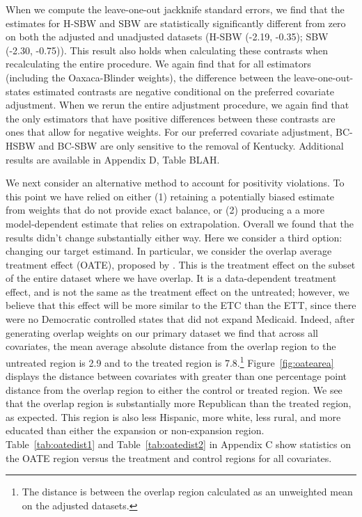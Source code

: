 \documentclass[12pt]{article}
\begin{document}
When we compute the leave-one-out jackknife standard errors, we find that the estimates for H-SBW and SBW are statistically significantly different from zero on both the adjusted and unadjusted datasets (H-SBW (-2.19, -0.35); SBW (-2.30, -0.75)). This result also holds when calculating these contrasts when recalculating the entire procedure. We again find that for all estimators (including the Oaxaca-Blinder weights), the difference between the leave-one-out-states estimated contrasts are negative conditional on the preferred covariate adjustment. When we rerun the entire adjustment procedure, we again find that the only estimators that have positive differences between these contrasts are ones that allow for negative weights. For our preferred covariate adjustment, BC-HSBW and BC-SBW are only sensitive to the removal of Kentucky. Additional results are available in Appendix D, Table BLAH. 

We next consider an alternative method to account for positivity violations. To this point we have relied on either (1) retaining a potentially biased estimate from weights that do not provide exact balance, or (2) producing a a more model-dependent estimate that relies on extrapolation. Overall we found that the results didn't change substantially either way. Here we consider a third option: changing our target estimand. In particular, we consider the overlap average treatment effect (OATE), proposed by \cite{li2018balancing}. This is the treatment effect on the subset of the entire dataset where we have overlap. It is a data-dependent treatment effect, and is not the same as the treatment effect on the untreated; however, we believe that this effect will be more similar to the ETC than the ETT, since there were no Democratic controlled states that did not expand Medicaid. Indeed, after generating overlap weights on our primary dataset we find that across all covariates, the mean average absolute distance from the overlap region to the untreated region is 2.9 and to the treated region is 7.8.\footnote{The distance is between the overlap region calculated as an unweighted mean on the adjusted datasets.} Figure~\ref{fig:oatearea} displays the distance between covariates with greater than one percentage point distance from the overlap region to either the control or treated region. We see that the overlap region is substantially more Republican than the treated region, as expected. This region is also less Hispanic, more white, less rural, and more educated than either the expansion or non-expansion region. Table~\ref{tab:oatedist1} and Table~\ref{tab:oatedist2} in Appendix C show statistics on the OATE region versus the treatment and control regions for all covariates.
\end{document}
